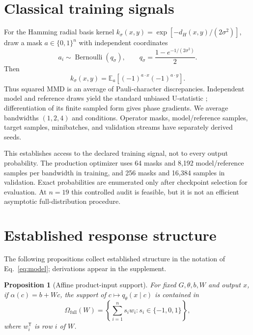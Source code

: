 \documentclass[a4paper,twocolumn,11pt,unpublished]{quantumarticle}
\newtheorem{proposition}{Proposition}
\newcommand{\bits}{\{0,1\}}
\newcommand{\E}{\mathbb{E}}
\begin{document}
\section{Classical training signals}
\label{sec:signals}

For the Hamming radial basis kernel
$k_\sigma(x,y)=\exp[-d_H(x,y)/(2\sigma^2)]$, draw a mask
$a\in\bits^n$ with independent coordinates
\begin{equation}
 a_i\sim\operatorname{Bernoulli}(q_\sigma),\qquad
 q_\sigma=\frac{1-e^{-1/(2\sigma^2)}}{2}.
 \label{eq:mask-law}
\end{equation}
Then
\begin{equation}
 k_\sigma(x,y)=\E_a[(-1)^{a\cdot x}(-1)^{a\cdot y}].
 \label{eq:character-kernel}
\end{equation}
Thus squared MMD is an average of Pauli-character discrepancies.  Independent
model and reference draws yield the standard unbiased U-statistic
\cite{grettonKernelTwoSample2012}; differentiation of its finite sampled form
gives phase gradients.  We average bandwidths $(1,2,4)$ and conditions.
Operator masks, model/reference samples, target samples, minibatches, and
validation streams have separately derived seeds.

This establishes access to the declared training signal, not to every output
probability.  The production optimizer uses 64 masks and 8,192
model/reference samples per bandwidth in training, and 256 masks and 16,384
samples in validation.  Exact probabilities are enumerated only after
checkpoint selection for evaluation.  At $n=19$ this controlled audit is
feasible, but it is not an efficient asymptotic full-distribution procedure.

\section{Established response structure}
\label{sec:response}

The following propositions collect established structure in the notation of
Eq.~\eqref{eq:model}; derivations appear in the supplement.

\begin{proposition}[Affine product-input support]
For fixed $G,\theta,b,W$ and output $x$, if
$\alpha(c)=b+Wc$, the support of $c\mapsto q_\theta(x\mid c)$ is contained in
\begin{equation}
 \Omega_{\mathrm{full}}(W)=
 \left\{\sum_{i=1}^{n}s_iw_i:s_i\in\{-1,0,1\}\right\},
 \label{eq:full-support}
\end{equation}
where $w_i^\mathsf{T}$ is row $i$ of $W$.
\end{proposition}
\end{document}

